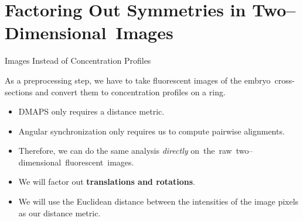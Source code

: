 \section[Factoring Out Symmetries in Two--Dimensional~Images]{Factoring Out Symmetries in Two--Dimensional~Images}

\begin{frame}{Images Instead of Concentration Profiles}
	
	\centering
    As a preprocessing step, we have to take fluorescent images of the embryo~cross-sections and convert them to concentration profiles on a ring.
    
    \centering
    
    \begin{itemize}
    	\item DMAPS only requires a distance metric.
    	\item Angular synchronization only requires us to compute pairwise alignments.
    	\item Therefore, we can do the same analysis {\em directly} on~the~raw~two--dimensional~fluorescent~images.
    	\item We will factor out {\bf translations and rotations}.
    	\item We will use the Euclidean distance between the intensities of the image pixels as our distance metric.
    \end{itemize}
    
	\end{frame}

